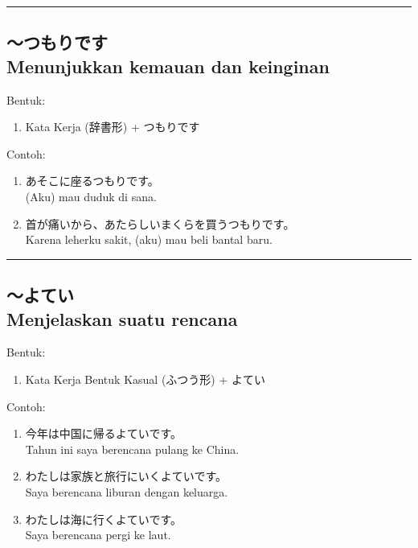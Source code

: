 \vspace{0.2cm}\hrule height 1pt\vspace{0.2cm}


\subsection*{
    ～つもりです \\
    Menunjukkan kemauan dan keinginan
}
Bentuk:
\begin{enumerate}
    \item Kata Kerja (辞書形) + つもりです
\end{enumerate}
Contoh: 
\begin{enumerate}
    \item あそこに座るつもりです。
    \\ (Aku) mau duduk di sana.
    \item 首が痛いから、あたらしいまくらを買うつもりです。
    \\ Karena leherku sakit, (aku) mau beli bantal baru.
\end{enumerate}

\vspace{0.2cm}\hrule height 1pt\vspace{0.2cm}

\newpage
\subsection*{
    ～よてい \\
    Menjelaskan suatu rencana
}
Bentuk:
\begin{enumerate}
    \item Kata Kerja Bentuk Kasual (ふつう形) + よてい
\end{enumerate}
Contoh: 
\begin{enumerate}
    \item 今年は中国に帰るよていです。
    \\ Tahun ini saya berencana pulang ke China.
    \item わたしは家族と旅行にいくよていです。
    \\ Saya berencana liburan dengan keluarga.
    \item わたしは海に行くよていです。
    \\ Saya berencana pergi ke laut.
\end{enumerate}

